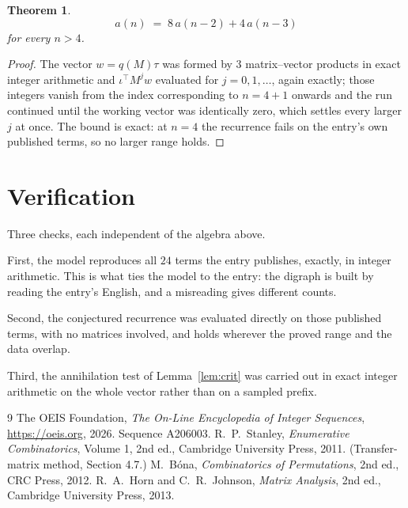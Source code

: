 \documentclass[11pt,a4paper]{article}
\theoremstyle{plain}
\newtheorem{theorem}{Theorem}
\theoremstyle{definition}
\begin{document}
\begin{theorem}
\[
a(n)\;=\;8\,a(n-2) + 4\,a(n-3)
\]
for every $n>4$.
\end{theorem}

\begin{proof}
The vector $w=q(M)\tau$ was formed by $3$ matrix--vector products in exact integer
arithmetic and $\iota^{\!\top}M^{j}w$ evaluated for $j=0,1,\dots$, again exactly; those
integers vanish from the index corresponding to $n=4+1$ onwards and the run continued
until the working vector was identically zero, which settles every larger $j$ at once. The bound is exact: at $n=4$ the recurrence fails on the entry's own published terms, so no larger range holds.
\end{proof}

\section{Verification}

Three checks, each independent of the algebra above.

First, the model reproduces all $24$ terms the entry publishes, exactly, in integer
arithmetic. This is what ties the model to the entry: the digraph is built by reading the
entry's English, and a misreading gives different counts.

Second, the conjectured recurrence was evaluated directly on those published terms, with no
matrices involved, and holds wherever the proved range and the data overlap.

Third, the annihilation test of Lemma~\ref{lem:crit} was carried out in exact integer
arithmetic on the whole vector rather than on a sampled prefix.

\begin{thebibliography}{9}
 The OEIS Foundation, \emph{The On-Line Encyclopedia of Integer
Sequences}, \url{https://oeis.org}, 2026. Sequence A206003.
 R.~P.~Stanley, \emph{Enumerative Combinatorics}, Volume 1, 2nd ed.,
Cambridge University Press, 2011. (Transfer-matrix method, Section 4.7.)
 M.~B\'ona, \emph{Combinatorics of Permutations}, 2nd ed., CRC
Press, 2012.
 R.~A.~Horn and C.~R.~Johnson, \emph{Matrix Analysis}, 2nd ed., Cambridge
University Press, 2013.
\end{thebibliography}
\end{document}
